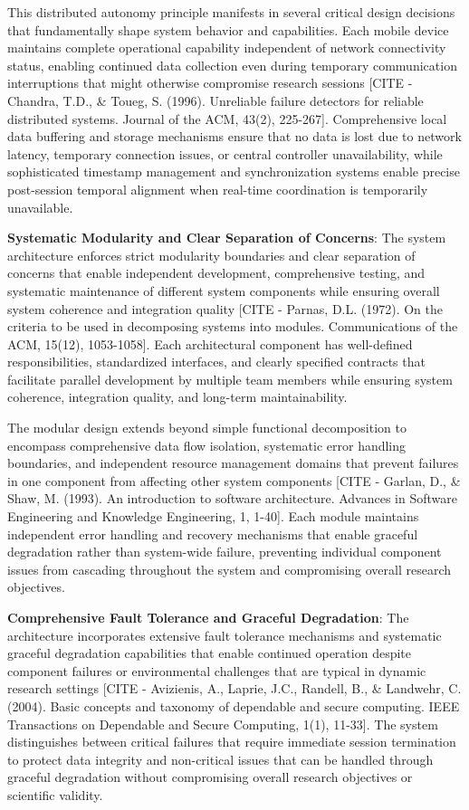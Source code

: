 \documentclass[12pt,a4paper]{report}
\begin{document}
This distributed autonomy principle manifests in several critical design decisions that fundamentally shape system
behavior and capabilities. Each mobile device maintains complete operational capability independent of network
connectivity status, enabling continued data collection even during temporary communication interruptions that might
otherwise compromise research
sessions [CITE - Chandra, T.D., \& Toueg, S. (1996). Unreliable failure detectors for reliable distributed systems. Journal of the ACM, 43(2), 225-267].
Comprehensive local data buffering and storage mechanisms ensure that no data is lost due to network latency, temporary
connection issues, or central controller unavailability, while sophisticated timestamp management and synchronization
systems enable precise post-session temporal alignment when real-time coordination is temporarily unavailable.

\textbf{Systematic Modularity and Clear Separation of Concerns}: The system architecture enforces strict modularity
boundaries and clear separation of concerns that enable independent development, comprehensive testing, and systematic
maintenance of different system components while ensuring overall system coherence and integration
quality [CITE - Parnas, D.L. (1972). On the criteria to be used in decomposing systems into modules. Communications of the ACM, 15(12), 1053-1058].
Each architectural component has well-defined responsibilities, standardized interfaces, and clearly specified contracts
that facilitate parallel development by multiple team members while ensuring system coherence, integration quality, and
long-term maintainability.

The modular design extends beyond simple functional decomposition to encompass comprehensive data flow isolation,
systematic error handling boundaries, and independent resource management domains that prevent failures in one component
from affecting other system
components [CITE - Garlan, D., \& Shaw, M. (1993). An introduction to software architecture. Advances in Software Engineering and Knowledge Engineering, 1, 1-40].
Each module maintains independent error handling and recovery mechanisms that enable graceful degradation rather than
system-wide failure, preventing individual component issues from cascading throughout the system and compromising
overall research objectives.

\textbf{Comprehensive Fault Tolerance and Graceful Degradation}: The architecture incorporates extensive fault tolerance
mechanisms and systematic graceful degradation capabilities that enable continued operation despite component failures
or environmental challenges that are typical in dynamic research
settings [CITE - Avizienis, A., Laprie, J.C., Randell, B., \& Landwehr, C. (2004). Basic concepts and taxonomy of dependable and secure computing. IEEE Transactions on Dependable and Secure Computing, 1(1), 11-33].
The system distinguishes between critical failures that require immediate session termination to protect data integrity
and non-critical issues that can be handled through graceful degradation without compromising overall research
objectives or scientific validity.
\end{document}
